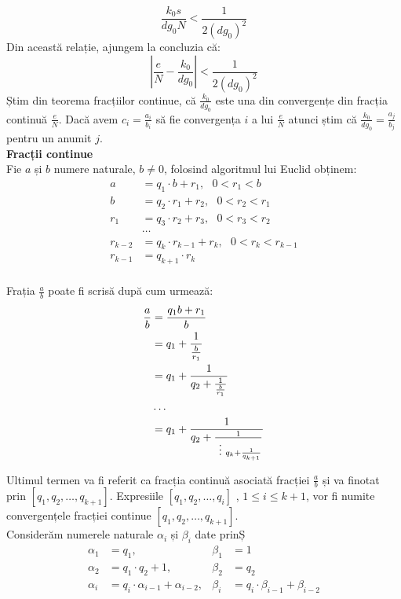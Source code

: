 \documentclass[12pt, oneside]{book}
\begin{document}
$$ \frac{k_0s}{dg_0N} < \frac{1}{2(dg_0)^2}$$
Din această relație, ajungem la concluzia că:
$$ \left| \frac{e}{N} - \frac{k_0}{dg_0} \right| < \frac{1}{2(dg_0)^2}$$
Știm din teorema fracțiilor continue, că $\frac{k_0}{dg_0}$ este una din convergențe din fracția continuă $\frac{e}{N}$. Dacă avem $c_i = \frac{a_i}{b_i}$ să fie convergența $i$ a lui $\frac{e}{N}$ atunci știm că $\frac{k_0}{dg_0} = \frac{a_j}{b_j}$ pentru un anumit $j$. \\
\textbf{Fracții continue} \\
Fie $a$ și $b$ numere naturale, $b \neq 0$, folosind algoritmul lui Euclid obținem:
\begin{align*}
a&= q_1  \cdot b+r_1, \ \ \ 0<r_1<b \\
b&=q_2 \cdot r_1+r_2, \ \ \ 0<r_2<r_1 \\
r_1&= q_3 \cdot r_2+r_3, \ \ \ 0<r_3<r_2 \\
&\dots \\
r_{k-2} &= q_k  \cdot r_{k-1} +r_k , \ \ \ 0<r_k<r_{k-1} \\
r_{k-1} &= q_{k+1} \cdot   r_k \\
\end{align*}

Frația $\frac{a}{b} $ poate fi scrisă după cum urmează:
\begin{align*}
 \frac{a}{b} &= \frac{q_1b+r_1}{b} \\
 &= q_1 + \frac{1}{\frac{b}{r_1}}\\
 &= q_1 + \frac{1}{q_2 + \frac{1}{ \frac{b}{r_1}}} \\
&\dots \\
 &= q_1 + \frac{1}{q_2 + \frac{1}{\vdotswithin{q_k} q_k + \frac{1}{q_{k+1}}}} \\
\end{align*}

Ultimul termen va fi referit ca fracția continuă asociată fracției $\frac{a}{b}$ și va finotat prin $[ q_1,q_2, \dots ,q_{k+1}]$. Expresiile $[q_1,q_2, \dots ,q_i]$ , $1 \leq i \leq k+1$, vor fi numite convergențele fracției continue $[q_1,q_2, \dots ,q_{k+1}]$.\\
Considerăm numerele naturale $\alpha_{i}$ și $\beta_{i}$ date prinȘ
\begin{align*}
 \alpha_1 &=q_1,   &\beta_1&=1 \\
 \alpha_2 &= q_1 \cdot   q_2 + 1,   &\beta_2&=q_2 \\
 \alpha_i &= q_i \cdot   \alpha_{i-1} + \alpha_{i-2},    &\beta_i &= q_i \cdot   \beta_{i-1} + \beta_{i-2} \\
\end{align*}
\end{document}
